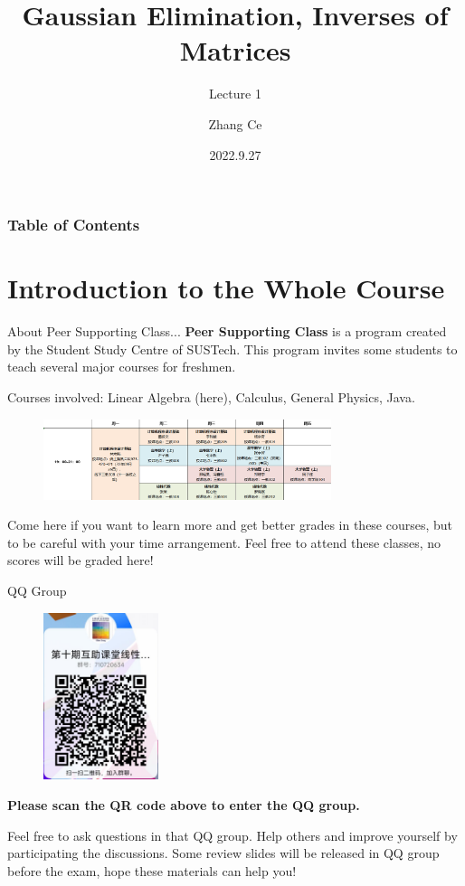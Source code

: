 \documentclass{beamer}
\title[Linear Algebra] %
{Gaussian Elimination, Inverses of Matrices}
\subtitle{Lecture 1}
\author[zhangc2019@mail.sustech.edu.cn] %
{
    Zhang Ce
}
\institute[] %
{
    Department of Electrical and Electronic Engineering\\
    Southern University of Science and Technology
}
\date[2022.9.27] %
{2022.9.27}
\begin{document}
\frame{\titlepage}


\begin{frame}
\frametitle{Table of Contents}
\tableofcontents
\end{frame}

\section{Introduction to the Whole Course}

\begin{frame}{About Peer Supporting Class...}
\textbf{Peer Supporting Class} is a program created by the Student Study Centre of SUSTech. This program invites some students to teach several major courses for freshmen.

Courses involved: Linear Algebra (here), Calculus, General Physics, Java.

\begin{figure}
    \centering
    \includegraphics[width=0.75\textwidth]{arrangement.png}
\end{figure}

Come here if you want to learn more and get better grades in these courses, but to be careful with your time arrangement. Feel free to attend these classes, no scores will be graded here!

\end{frame}

\begin{frame}{QQ Group}
\begin{figure}
    \centering
    \includegraphics[width=0.3\textwidth]{QR.PNG}
\end{figure}
\textbf{Please scan the QR code above to enter the QQ group.}

Feel free to ask questions in that QQ group. Help others and improve yourself by participating the discussions. Some review slides will be released in QQ group before the exam, hope these materials can help you!

\end{frame}
\end{document}
